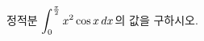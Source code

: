 \hspace*{2mm}\begin{minipage}[t]{\dimexpr\linewidth-2mm\relax}\vspace{0pt}
정적분 $\displaystyle\int_{0}^{\frac{\pi}{2}}x^2\cos x\mkern3mu dx$의 값을 구하시오.\end{minipage}
